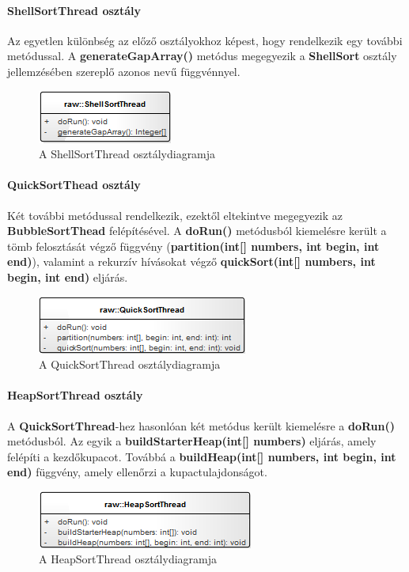 \documentclass{elteikthesis}
\begin{document}
\paragraph{ShellSortThread osztály}
Az egyetlen különbség az előző osztályokhoz képest, hogy rendelkezik egy további metódussal. A \textbf{generateGapArray()} metódus megegyezik a \textbf{ShellSort} osztály jellemzésében szereplő azonos nevű függvénnyel.
\begin{figure}[H]
	\centering
	\includegraphics{pics/class/ShellSortThread.png}
	\caption{A ShellSortThread osztálydiagramja}
\end{figure}
\paragraph{QuickSortThead osztály}
Két további metódussal rendelkezik, ezektől eltekintve megegyezik az \textbf{BubbleSortThead} felépítésével. A \textbf{doRun()} metódusból kiemelésre került a tömb felosztását végző függvény (\textbf{partition(int[] numbers, int begin, int end)}), valamint a rekurzív hívásokat végző \textbf{quickSort(int[] numbers, int begin, int end)} eljárás.
\begin{figure}[H]
	\centering
	\includegraphics{pics/class/QuickSortThread.png}
	\caption{A QuickSortThread osztálydiagramja}
\end{figure}
\paragraph{HeapSortThread osztály}
A \textbf{QuickSortThread}-hez hasonlóan két metódus került kiemelésre a \textbf{doRun()} metódusból. Az egyik a \textbf{buildStarterHeap(int[] numbers)} eljárás, amely felépíti a kezdőkupacot. Továbbá a \textbf{buildHeap(int[] numbers, int begin, int end)} függvény, amely ellenőrzi a kupactulajdonságot.
\begin{figure}[H]
	\centering
	\includegraphics{pics/class/HeapSortThread.png}
	\caption{A HeapSortThread osztálydiagramja}
\end{figure}
\end{document}
